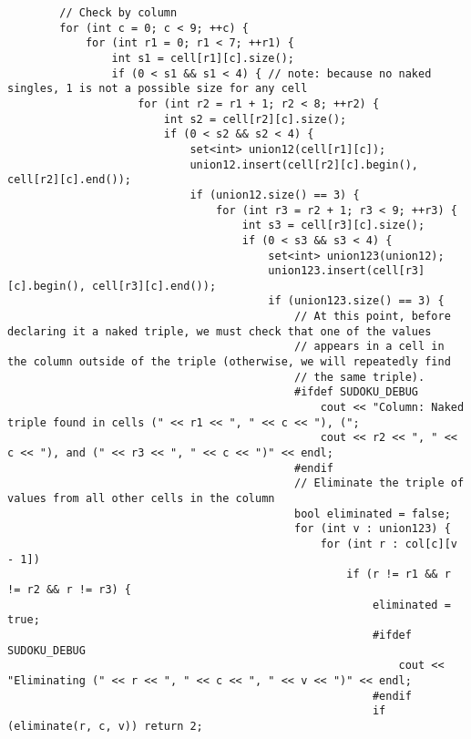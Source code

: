 \documentclass{article}
\begin{document}
\begin{lstlisting}
        // Check by column
        for (int c = 0; c < 9; ++c) {
            for (int r1 = 0; r1 < 7; ++r1) {
                int s1 = cell[r1][c].size();
                if (0 < s1 && s1 < 4) { // note: because no naked singles, 1 is not a possible size for any cell
                    for (int r2 = r1 + 1; r2 < 8; ++r2) {
                        int s2 = cell[r2][c].size();
                        if (0 < s2 && s2 < 4) {
                            set<int> union12(cell[r1][c]);
                            union12.insert(cell[r2][c].begin(), cell[r2][c].end());
                            if (union12.size() == 3) {
                                for (int r3 = r2 + 1; r3 < 9; ++r3) {
                                    int s3 = cell[r3][c].size();
                                    if (0 < s3 && s3 < 4) {
                                        set<int> union123(union12);
                                        union123.insert(cell[r3][c].begin(), cell[r3][c].end());
                                        if (union123.size() == 3) {
                                            // At this point, before declaring it a naked triple, we must check that one of the values
                                            // appears in a cell in the column outside of the triple (otherwise, we will repeatedly find
                                            // the same triple).
                                            #ifdef SUDOKU_DEBUG
                                                cout << "Column: Naked triple found in cells (" << r1 << ", " << c << "), (";
                                                cout << r2 << ", " << c << "), and (" << r3 << ", " << c << ")" << endl;
                                            #endif
                                            // Eliminate the triple of values from all other cells in the column
                                            bool eliminated = false;
                                            for (int v : union123) {
                                                for (int r : col[c][v - 1])
                                                    if (r != r1 && r != r2 && r != r3) {
                                                        eliminated = true;
                                                        #ifdef SUDOKU_DEBUG
                                                            cout << "Eliminating (" << r << ", " << c << ", " << v << ")" << endl;
                                                        #endif
                                                        if (eliminate(r, c, v)) return 2;

\end{lstlisting}
\end{document}
